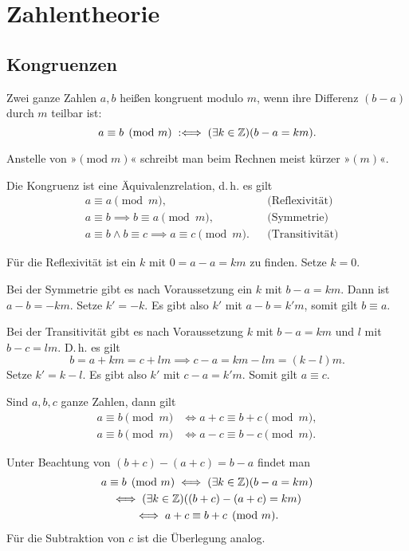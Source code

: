
\chapter{Zahlentheorie}

\section{Kongruenzen}

\begin{Definition}[Kongruenz]
Zwei ganze Zahlen $a,b$ heißen kongruent modulo $m$, wenn ihre Differenz
$(b-a)$ durch $m$ teilbar ist:%
\[a\equiv b\pmod{m}\;:\Longleftrightarrow\; (\exists k\in\mathbb Z)(b-a=km).\]
\end{Definition}
Anstelle von »$(\mathrm{mod}\;m)$« schreibt man beim Rechnen meist
kürzer »$(m)$«.

\begin{Satz}
Die Kongruenz ist eine Äquivalenzrelation, d.\,h. es gilt
\begin{align*}
&a\equiv a\pmod{m},&&\text{(Reflexivität)}\\
&a\equiv b\implies b\equiv a\pmod{m},&&\text{(Symmetrie)}\\
&a\equiv b\land b\equiv c\implies a\equiv c\pmod{m}.&&\text{(Transitivität)}
\end{align*}
\end{Satz}
 Für die Reflexivität ist ein $k$ mit $0=a-a=km$
zu finden. Setze $k=0$.

Bei der Symmetrie gibt es nach Voraussetzung
ein $k$ mit $b-a=km$. Dann ist $a-b=-km$. Setze $k'=-k$.
Es gibt also $k'$ mit $a-b=k'm$, somit gilt $b\equiv a$.

Bei der Transitivität gibt es nach Voraussetzung $k$ mit
$b-a=km$ und $l$ mit $b-c=lm$. D.\,h. es gilt
\[b = a+km = c+lm\implies c-a = km-lm = (k-l)m.\]
Setze $k'=k-l$. Es gibt also $k'$ mit $c-a=k'm$. Somit gilt $a\equiv c$.\;\qedsymbol

\begin{Satz}
Sind $a,b,c$ ganze Zahlen, dann gilt
\begin{align*}
a\equiv b\pmod{m}&\iff a+c\equiv b+c\pmod{m},\\
a\equiv b\pmod{m}&\iff a-c\equiv b-c\pmod{m}.
\end{align*}
\end{Satz}
Unter Beachtung von $(b+c)-(a+c)=b-a$ findet man
\begin{gather*}
a\equiv b\pmod{m}
\iff (\exists k\in\mathbb Z)(b-a=km)\\
\iff (\exists k\in\mathbb Z)((b+c)-(a+c)=km)\\
\iff a+c\equiv b+c\pmod{m}.
\end{gather*}
Für die Subtraktion von $c$ ist die Überlegung analog.\;\qedsymbol

